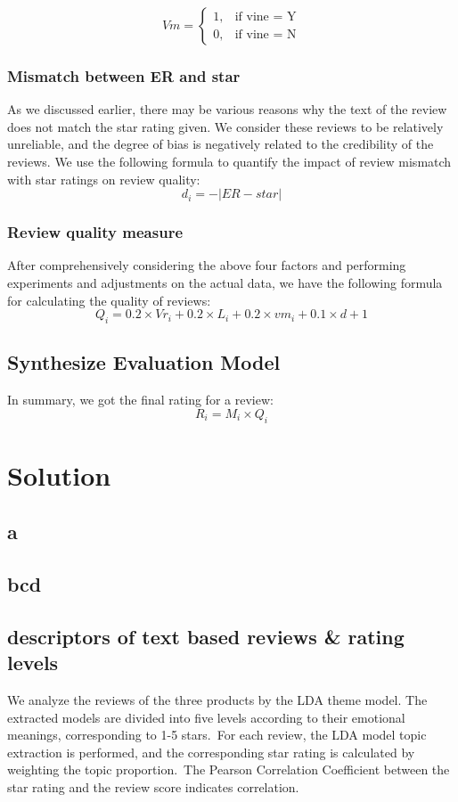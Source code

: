 \documentclass{mcmthesis}
\begin{document}
\[
Vm = 
\begin{cases}  
	1, &\text{if vine = Y} \\
	0, &\text{if vine = N}
\end{cases}
\]

\subsubsection{ Mismatch between ER and star}
As we discussed earlier, there may be various reasons why the text of the review does not match the star rating given. We consider these reviews to be relatively unreliable, and the degree of bias is negatively related to the credibility of the reviews. We use the following formula to quantify the impact of review mismatch with star ratings on review quality:
\[
	d_{i}  = -|ER - star|
\]

\subsubsection{Review quality measure}
After comprehensively considering the above four factors and performing experiments and adjustments on the actual data, we have the following formula for calculating the quality of reviews:
\[
Q_i = 0.2 \times Vr_i + 0.2 \times L_i + 0.2 \times vm_i + 0.1 \times d + 1
\]

\subsection{Synthesize Evaluation Model}
In summary, we got the final rating for a review:
\[
 R_i = M_i \times Q_i
\]

\section{ Solution }

\subsection{a}
\subsection{bcd}
\subsection{descriptors of text based reviews \& rating levels}
We analyze the reviews of the three products by the LDA theme model. The extracted models are divided into five levels according to their emotional meanings, corresponding to 1-5 stars. For each review, the LDA model topic extraction is performed, and the corresponding star rating is calculated by weighting the topic proportion. The Pearson Correlation Coefficient between the star rating and the review score indicates correlation.
\end{document}
